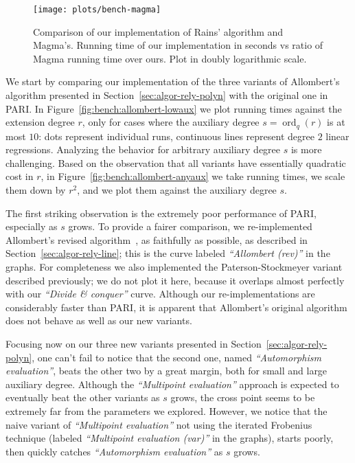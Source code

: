 \documentclass{mcom-l}
\theoremstyle{plain}
\theoremstyle{definition}
\DeclareMathOperator{\order}{ord} %
\newcounter{algorithm}
\begin{document}
\begin{figure}
  \centering
  \texttt{[image: plots/bench-magma]}
  \caption{Comparison of our implementation of Rains' algorithm and
    Magma's. Running time of our implementation in seconds vs ratio of
    Magma running time over ours. Plot in doubly logarithmic scale.}
  \label{fig:bench:magma}
\end{figure}

We start by comparing our implementation of the three variants of
Allombert's algorithm presented in Section~\ref{sec:algor-rely-polyn}
with the original one in PARI. %
In Figure~\ref{fig:bench:allombert-lowaux} we plot running times
against the extension degree $r$, only for cases where the auxiliary
degree $s=\order_q(r)$ is at most $10$: dots represent individual
runs, continuous lines represent degree $2$ linear regressions. %
Analyzing the behavior for arbitrary auxiliary degree $s$ is more
challenging. %
Based on the observation that all variants have essentially quadratic
cost in $r$, in Figure~\ref{fig:bench:allombert-anyaux} we take
running times, we scale them down by $r^2$, and we plot them against
the auxiliary degree $s$. %

The first striking observation is the extremely poor performance of
PARI, especially as $s$ grows. %
To provide a fairer comparison, we re-implemented Allombert's revised
algorithm~\cite{Allombert02-rev}, as faithfully as possible, as
described in Section~\ref{sec:algor-rely-line}; this is the curve
labeled \emph{``Allombert (rev)''} in the graphs. %
For completeness we also implemented the Paterson-Stockmeyer variant
described previously; we do not plot it here, because it overlaps
almost perfectly with our \emph{``Divide \& conquer''} curve. %
Although our re-implementations are considerably faster than PARI, it
is apparent that Allombert's original algorithm does not behave as
well as our new variants.

Focusing now on our three new variants presented in
Section~\ref{sec:algor-rely-polyn}, one can't fail to notice that the
second one, named \emph{``Automorphism evaluation''}, beats the other
two by a great margin, both for small and large auxiliary degree. %
Although the \emph{``Multipoint evaluation''} approach is expected to
eventually beat the other variants as $s$ grows, the cross point seems
to be extremely far from the parameters we explored. %
However, we notice that the naive variant of \emph{``Multipoint
  evaluation''} not using the iterated Frobenius technique (labeled
\emph{``Multipoint evaluation (var)''} in the graphs), starts poorly,
then quickly catches \emph{``Automorphism evaluation''} as $s$ grows.
\end{document}
